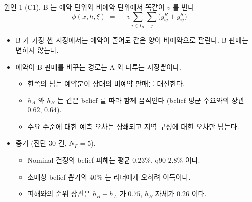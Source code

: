 \documentclass[aspectratio=169,11pt]{beamer}
\begin{document}
\begin{frame}{원인 1 (C1). B 는 예약 단위와 비예약 단위에서 똑같이 $v$ 를 번다}
\begin{equation*}
\phi(x,h,\xi) \;=\; -v\textstyle\sum_{i\in I_B}\sum_{j}\big(y^{R}_{ij}+y^{S}_{ij}\big)
\end{equation*}
\begin{itemize}
  \item B 가 가장 싼 시장에서는 예약이 줄어도 같은 양이 비예약으로 팔린다. B 판매는 변하지 않는다.
  \item 예약이 B 판매를 바꾸는 경로는 A 와 다투는 시장뿐이다.
  \begin{itemize}
    \item 한쪽의 남는 예약분이 상대의 비예약 판매를 대신한다.
    \item $h_A$ 와 $h_B$ 는 같은 belief 를 따라 함께 움직인다 (belief 평균 수요와의 상관 $0.62$, $0.64$).
    \item 수요 수준에 대한 예측 오차는 상쇄되고 지역 구성에 대한 오차만 남는다.
  \end{itemize}
  \item 증거 (진단 30 건, $N_F = 5$).
  \begin{itemize}
    \item Nominal 결정의 belief 피해는 평균 $0.23\%$, q90 $2.8\%$ 이다.
    \item 소매상 belief 뽑기의 $40\%$ 는 리더에게 오히려 이득이다.
    \item 피해와의 순위 상관은 $h_B - h_A$ 가 $0.75$, $h_B$ 자체가 $0.26$ 이다.
  \end{itemize}
\end{itemize}
\end{frame}
\end{document}
